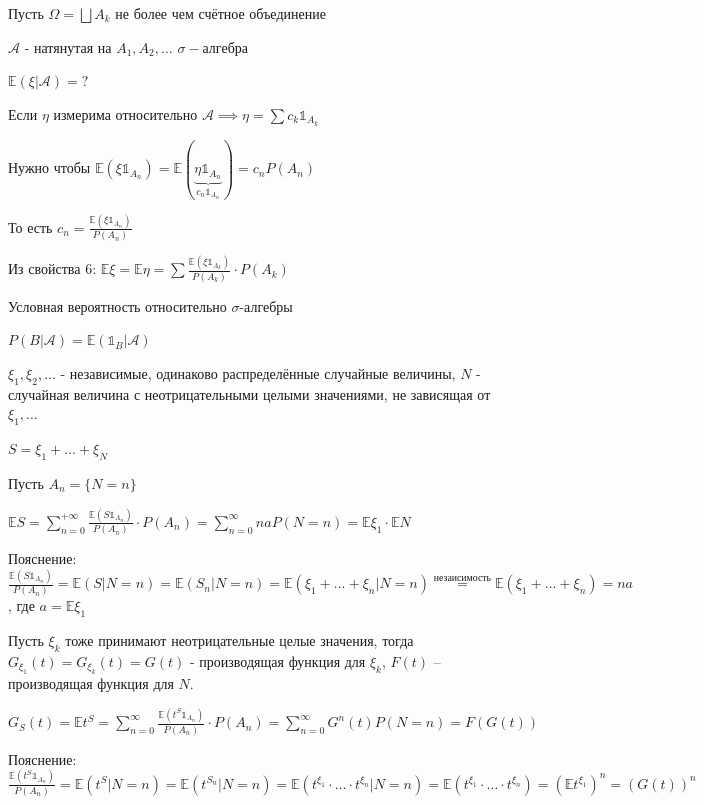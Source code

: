 \begin{example}
    Пусть $\Omega = \bigsqcup A_k$  не более чем счётное объединение

    $\mathcal{A}$ - натянутая на $A_1, A_2, \ldots$ $\sigma-$алгебра

    $\mathbb{E} (\xi | \mathcal{A}) = ?$

    Если $\eta$ измерима относительно $\mathcal{A} \implies \eta = \sum c_k \mathds{1}_{A_k}$

    Нужно чтобы $\mathbb{E} (\xi \mathds{1}_{A_n}) = \mathbb{E} (\underbrace{\eta \mathds{1}_{A_n}}_{c_n \mathds{1}_{A_n}}) = c_n P(A_n)$

    То есть $c_n = \frac{\mathbb{E} (\xi \mathds{1}_{A_n})}{P(A_n)}$

    \begin{remark}
        Из свойства 6: $\mathbb{E} \xi = \mathbb{E} \eta = \sum \frac{\mathbb{E} (\xi \mathds{1}_{A_k})}{P(A_k)} \cdot P(A_k)$
    \end{remark}
\end{example}

\begin{definition}
    Условная вероятность относительно $\sigma$-алгебры

    $P(B | \mathcal{A}) = \mathbb{E} (\mathds{1}_B | \mathcal{A})$
\end{definition}

\begin{example}
    $\xi_1, \xi_2, \ldots$ - независимые, одинаково распределённые случайные величины, $N$ - случайная величина с неотрицательными целыми значениями, не зависящая от $\xi_1, \ldots$

    $S = \xi_1 + \ldots + \xi_{N}$

    Пусть $A_n = \{ N = n \}$

    $\mathbb{E} S = \sum\limits_{n = 0}^{+\infty} \frac{\mathbb{E} (S \mathds{1}_{A_n})}{P(A_n)} \cdot P(A_n) = \sum\limits_{n = 0}^\infty na P(N = n) = \mathbb{E} \xi_1 \cdot \mathbb{E} N$

    Пояснение: $\frac{\mathbb{E} (S \mathds{1}_{A_n})}{P(A_n)} = \mathbb{E} (S | N = n) = \mathbb{E} (S_n | N = n) = \mathbb{E} (\xi_1 + \ldots + \xi_n | N = n) \overset{\text{незаисимость}}{=} \mathbb{E} (\xi_1 + \ldots + \xi_n) = na$, где $a = \mathbb{E} \xi_1$
\end{example}

\begin{example}
    Пусть $\xi_k$ тоже принимают неотрицательные целые значения, тогда $G_{\xi_1} (t) = G_{\xi_k} (t) = G(t)$ - производящая функция для $\xi_k$, $F(t)$ -- производящая функция для $N$.

    $G_S (t) = \mathbb{E} t^S = \sum_{n = 0}^\infty \frac{\mathbb{E} (t^S \mathds{1}_{A_n})}{P(A_n)} \cdot P(A_n) = \sum\limits_{n = 0}^\infty G^n (t) P(N = n) = F (G (t))$

    Пояснение: $\frac{\mathbb{E} (t^S \mathds{1}_{A_n})}{P(A_n)} = \mathbb{E} (t^S | N = n) = \mathbb{E} (t^{S_n} | N = n) = \mathbb{E} (t^{\xi_1} \cdot \ldots \cdot t^{\xi_n} | N = n) = \mathbb{E} (t^{\xi_1} \cdot \ldots \cdot t^{\xi_n}) = (\mathbb{E} t^{\xi_1})^n = (G(t))^n$
\end{example}

